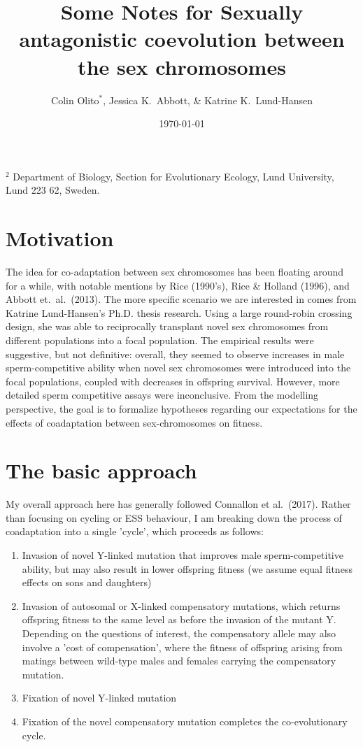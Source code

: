 \documentclass{article}
\title{Some Notes for Sexually antagonistic coevolution between the sex chromosomes}
\author{Colin Olito$^{\ast}$, Jessica K.~Abbott, \& Katrine K.~Lund-Hansen}
\date{\today}
\begin{document}
\maketitle

\noindent{} $^{2}$ Department of Biology, Section for Evolutionary Ecology, Lund University, Lund 223 62, Sweden.

\bigskip



\newpage{}
\section*{Motivation}

\noindent{} The idea for co-adaptation between sex chromosomes has been floating around for a while, with notable mentions by Rice (1990's), Rice \& Holland (1996), and Abbott et.~al.~(2013). The more specific scenario we are interested in comes from Katrine Lund-Hansen's Ph.D. thesis research. Using a large round-robin crossing design, she was able to reciprocally transplant novel sex chromosomes from different populations into a focal population. The empirical results were suggestive, but not definitive: overall, they seemed to observe increases in male sperm-competitive ability when novel sex chromosomes were introduced into the focal populations, coupled with decreases in offspring survival. However, more detailed sperm competitive assays were inconclusive. From the modelling perspective, the goal is to formalize hypotheses regarding our expectations for the effects of coadaptation between sex-chromosomes on fitness.
\newpage{}


\section*{The basic approach}

My overall approach here has generally followed Connallon et al.~(2017). Rather than focusing on cycling or ESS behaviour, I am breaking down the process of coadaptation into a single 'cycle', which proceeds as follows: 

\begin{enumerate}
	\item Invasion of novel Y-linked mutation that improves male sperm-competitive ability, but may also result in lower offspring fitness (we assume equal fitness effects on sons and daughters)
	\item Invasion of autosomal or X-linked compensatory mutations, which returns offspring fitness to the same level as before the invasion of the mutant Y. Depending on the questions of interest, the compensatory allele may also involve a 'cost of compensation', where the fitness of offspring arising from matings between wild-type males and females carrying the compensatory mutation.
	\item Fixation of novel Y-linked mutation
	\item Fixation of the novel compensatory mutation completes the co-evolutionary cycle.
\end{enumerate}
\end{document}
